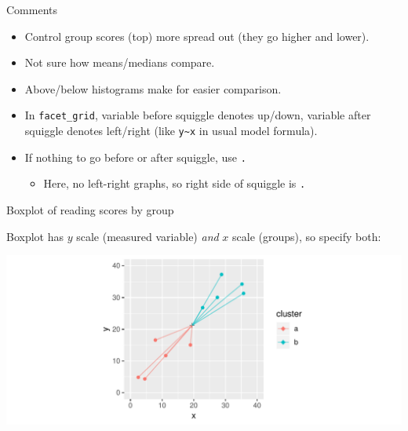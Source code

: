 \begin{frame}[fragile]{Comments}
  
  \begin{itemize}
  \item Control group scores (top) more spread out (they go higher
    and lower).
  \item Not sure how means/medians compare.
  \item Above/below histograms make for easier comparison.
  \item In \texttt{facet\_grid}, variable before squiggle denotes
    up/down, variable after squiggle denotes left/right (like
    \verb=y~x= in usual model formula).
  \item If nothing to go before or after squiggle, use \texttt{.}
    \begin{itemize}
    \item Here, no left-right graphs, so right side of squiggle is \texttt{.}
    \end{itemize}
  \end{itemize}
  
\end{frame}

\begin{frame}[fragile]{Boxplot of reading scores by group}

  Boxplot has $y$ scale (measured variable) \emph{and} $x$ scale
  (groups), so specify both:
  
\begin{knitrout}
\color{fgcolor}\begin{kframe}
\begin{alltt}
\hlstd{(}\hlopt{+}\hlstd{()}
\end{alltt}
\end{kframe}
\includegraphics[width=\maxwidth]{figure/unnamed-chunk-6-1} 

\end{knitrout}
  
\end{frame}

